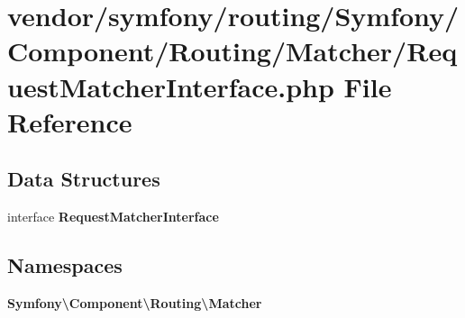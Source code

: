 \section{vendor/symfony/routing/\+Symfony/\+Component/\+Routing/\+Matcher/\+Request\+Matcher\+Interface.php File Reference}
\label{routing_2_symfony_2_component_2_routing_2_matcher_2_request_matcher_interface_8php}
\subsection*{Data Structures}
\begin{DoxyCompactItemize}
\item 
interface {\bf Request\+Matcher\+Interface}
\end{DoxyCompactItemize}
\subsection*{Namespaces}
\begin{DoxyCompactItemize}
\item 
 {\bf Symfony\textbackslash{}\+Component\textbackslash{}\+Routing\textbackslash{}\+Matcher}
\end{DoxyCompactItemize}
